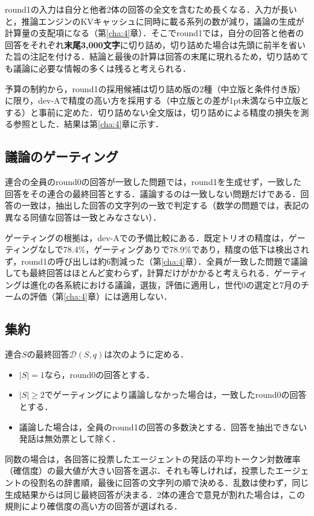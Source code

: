round1の入力は自分と他者2体の回答の全文を含むため長くなる．入力が長いと，推論エンジンのKVキャッシュに同時に載る系列の数が減り，議論の生成が計算量の支配項になる（第\ref{cha:4}章）．そこでround1では，自分の回答と他者の回答をそれぞれ\textbf{末尾3,000文字}に切り詰め，切り詰めた場合は先頭に前半を省いた旨の注記を付ける．結論と最後の計算は回答の末尾に現れるため，切り詰めても議論に必要な情報の多くは残ると考えられる．

予算の制約から，round1の採用候補は切り詰め版の2種（中立版と条件付き版）に限り，dev-Aで精度の高い方を採用する（中立版との差が1pt未満なら中立版とする）と事前に定めた．切り詰めない全文版は，切り詰めによる精度の損失を測る参照とした．結果は第\ref{cha:4}章に示す．

\subsection{議論のゲーティング}
\label{sec:3.3.3}

連合の全員のround0の回答が一致した問題では，round1を生成せず，一致した回答をその連合の最終回答とする．議論するのは一致しない問題だけである．回答の一致は，抽出した回答の文字列の一致で判定する（数学の問題では，表記の異なる同値な回答は一致とみなさない）．

ゲーティングの根拠は，dev-Aでの予備比較にある．既定トリオの精度は，ゲーティングなしで78.4\%，ゲーティングありで78.9\%であり，精度の低下は検出されず，round1の呼び出しは約6割減った（第\ref{cha:4}章）．全員が一致した問題で議論しても最終回答はほとんど変わらず，計算だけがかかると考えられる．ゲーティングは進化の各系統における議論，選抜，評価に適用し，世代0の選定と7月のチームの評価（第\ref{cha:4}章）には適用しない．

\subsection{集約}
\label{sec:3.3.4}

連合$S$の最終回答$\mathcal{D}(S, q)$は次のように定める．
\begin{itemize}
\item $|S| = 1$なら，round0の回答とする．
\item $|S| \geq 2$でゲーティングにより議論しなかった場合は，一致したround0の回答とする．
\item 議論した場合は，全員のround1の回答の多数決とする．回答を抽出できない発話は無効票として除く．
\end{itemize}
同数の場合は，各回答に投票したエージェントの発話の平均トークン対数確率（確信度）の最大値が大きい回答を選ぶ．それも等しければ，投票したエージェントの役割名の辞書順，最後に回答の文字列の順で決める．乱数は使わず，同じ生成結果からは同じ最終回答が決まる．2体の連合で意見が割れた場合は，この規則により確信度の高い方の回答が選ばれる．

